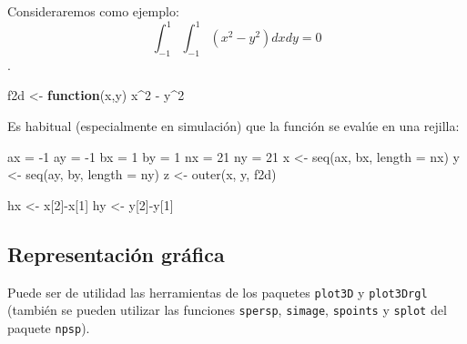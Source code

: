 \documentclass[
]{book}
\newenvironment{Shaded}{\begin{snugshade}}{\end{snugshade}}
\newcommand{\AttributeTok}[1]{\textcolor[rgb]{0.77,0.63,0.00}{#1}}
\newcommand{\ControlFlowTok}[1]{\textcolor[rgb]{0.13,0.29,0.53}{\textbf{#1}}}
\newcommand{\DecValTok}[1]{\textcolor[rgb]{0.00,0.00,0.81}{#1}}
\newcommand{\FunctionTok}[1]{\textcolor[rgb]{0.00,0.00,0.00}{#1}}
\newcommand{\NormalTok}[1]{#1}
\newcommand{\OtherTok}[1]{\textcolor[rgb]{0.56,0.35,0.01}{#1}}
\newcommand{\SpecialCharTok}[1]{\textcolor[rgb]{0.00,0.00,0.00}{#1}}
\theoremstyle{break}
\theoremstyle{nonumberplain}
\begin{document}
Consideraremos como ejemplo:
\[\int_{-1}^{1} \int_{-1}^{1} \left( x^2 - y^2 \right) dx dy = 0\].

\begin{Shaded}
\begin{Highlighting}[]
\NormalTok{f2d }\OtherTok{\textless{}{-}} \ControlFlowTok{function}\NormalTok{(x,y) x}\SpecialCharTok{\^{}}\DecValTok{2} \SpecialCharTok{{-}}\NormalTok{ y}\SpecialCharTok{\^{}}\DecValTok{2}
\end{Highlighting}
\end{Shaded}

Es habitual (especialmente en simulación) que la función se evalúe en una rejilla:

\begin{Shaded}
\begin{Highlighting}[]
\NormalTok{ax }\OtherTok{=} \SpecialCharTok{{-}}\DecValTok{1}
\NormalTok{ay }\OtherTok{=} \SpecialCharTok{{-}}\DecValTok{1}
\NormalTok{bx }\OtherTok{=} \DecValTok{1}
\NormalTok{by }\OtherTok{=} \DecValTok{1}
\NormalTok{nx }\OtherTok{=} \DecValTok{21}
\NormalTok{ny }\OtherTok{=} \DecValTok{21}
\NormalTok{x }\OtherTok{\textless{}{-}} \FunctionTok{seq}\NormalTok{(ax, bx, }\AttributeTok{length =}\NormalTok{ nx)}
\NormalTok{y }\OtherTok{\textless{}{-}} \FunctionTok{seq}\NormalTok{(ay, by, }\AttributeTok{length =}\NormalTok{ ny)}
\NormalTok{z }\OtherTok{\textless{}{-}} \FunctionTok{outer}\NormalTok{(x, y, f2d)}

\NormalTok{hx }\OtherTok{\textless{}{-}}\NormalTok{ x[}\DecValTok{2}\NormalTok{]}\SpecialCharTok{{-}}\NormalTok{x[}\DecValTok{1}\NormalTok{]}
\NormalTok{hy }\OtherTok{\textless{}{-}}\NormalTok{ y[}\DecValTok{2}\NormalTok{]}\SpecialCharTok{{-}}\NormalTok{y[}\DecValTok{1}\NormalTok{]}
\end{Highlighting}
\end{Shaded}

\hypertarget{representaciuxf3n-gruxe1fica}{%
\subsection{Representación gráfica}\label{representaciuxf3n-gruxe1fica}}

Puede ser de utilidad las herramientas de los paquetes \texttt{plot3D} y \texttt{plot3Drgl}
(también se pueden utilizar las funciones \texttt{spersp}, \texttt{simage}, \texttt{spoints} y \texttt{splot}
del paquete \texttt{npsp}).
\end{document}
